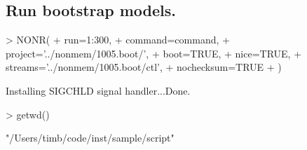 \subsection{Run bootstrap models.}
\begin{Schunk}
\begin{Sinput}
> NONR(
+      run=1:300,
+      command=command,
+      project='../nonmem/1005.boot/',
+      boot=TRUE,
+      nice=TRUE,
+      streams='../nonmem/1005.boot/ctl',
+      nochecksum=TRUE
+ )
\end{Sinput}
\begin{Soutput}
Installing SIGCHLD signal handler...Done.
\end{Soutput}
\begin{Sinput}
> getwd()  
\end{Sinput}
\begin{Soutput}
[1] "/Users/timb/code/inst/sample/script"
\end{Soutput}
\end{Schunk}

